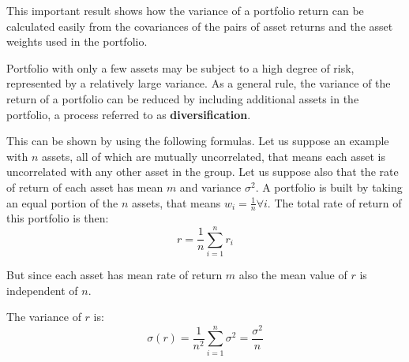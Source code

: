 This important result shows how the variance of a portfolio return can be calculated easily from the covariances of the pairs of asset returns and the asset weights used in the portfolio.

\hfill \break

Portfolio with only a few assets may be subject to a high degree of risk, represented by a relatively large variance. As a general rule, the variance of the return of a portfolio can be reduced by including additional assets in the portfolio, a process referred to as \textbf{diversification}.


This can be shown by using the following formulas. Let us suppose an example with $n$ assets, all of which are mutually uncorrelated, that means each asset is uncorrelated with any other asset in the group. Let us suppose also that the rate of return of each asset has mean $m$ and variance $\sigma^2$. A portfolio is built by taking an equal portion of the $n$ assets, that means $w_i = \frac{1}{n} \forall i$. The total rate of return of this portfolio is then:
$$r=\frac{1}{n}\sum_{i=1}^n r_i$$

But since each asset has mean rate of return $m$ also the mean value of $r$ is independent of $n$.

The variance of $r$ is:
$$\sigma(r)=\frac{1}{n^2} \sum^n_{i=1} \sigma^2 = \frac{\sigma^2}{n}$$

